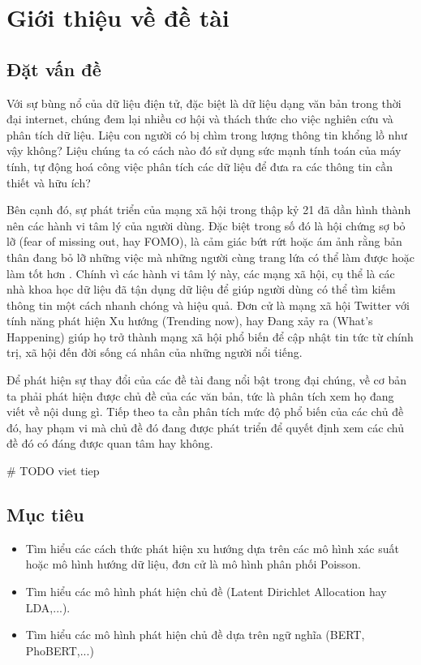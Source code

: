 \section{Giới thiệu về đề tài}
\label{sec:introduction}

\subsection{Đặt vấn đề}
Với sự bùng nổ của dữ liệu điện tử, đặc biệt là dữ liệu dạng văn bản trong thời
đại internet, chúng đem lại nhiều cơ hội và thách thức cho việc nghiên cứu và
phân tích dữ liệu. Liệu con người có bị chìm trong lượng thông tin khổng lồ như
vậy không? Liệu chúng ta có cách nào đó sử dụng sức mạnh tính toán của máy
tính, tự động hoá công việc phân tích các dữ liệu để đưa ra các thông tin cần
thiết và hữu ích?

Bên cạnh đó, sự phát triển của mạng xã hội trong thập kỷ 21 đã dần hình thành
nên các hành vi tâm lý của người dùng. Đặc biệt trong số đó là hội chứng sợ bỏ
lỡ (fear of missing out, hay FOMO), là cảm giác bứt rứt hoặc ám ảnh rằng bản
thân đang bỏ lỡ những việc mà những người cùng trang lứa có thể làm được hoặc
làm tốt hơn \cite{jwtintelligence_fear_2015}. Chính vì các hành vi tâm lý này,
các mạng xã hội, cụ thể là các nhà khoa học dữ liệu đã tận dụng dữ liệu để giúp
người dùng có thể tìm kiếm thông tin một cách nhanh chóng và hiệu quả. Đơn cử
là mạng xã hội Twitter với tính năng phát hiện Xu hướng (Trending now), hay
Đang xảy ra (What's Happening) giúp họ trở thành mạng xã hội phổ biến để cập
nhật tin tức từ chính trị, xã hội đến đời sống cá nhân của những người nổi
tiếng.

Để phát hiện sự thay đổi của các đề tài đang nổi bật trong đại chúng, về cơ bản
ta phải phát hiện được chủ đề của các văn bản, tức là phân tích xem họ đang
viết về nội dung gì.  Tiếp theo ta cần phân tích mức độ phổ biến của các chủ đề
đó, hay phạm vi mà chủ đề đó đang được phát triển để quyết định xem các chủ đề
đó có đáng được quan tâm hay không.

\# TODO viet tiep

\subsection{Mục tiêu}
\begin{itemize}
	\item Tìm hiểu các cách thức phát hiện xu hướng dựa trên các mô hình xác
		suất hoặc mô hình hướng dữ liệu, đơn cử là mô hình phân phối Poisson.

	\item Tìm hiểu các mô hình phát hiện chủ đề (Latent Dirichlet Allocation
		hay LDA,...).

	\item Tìm hiểu các mô hình phát hiện chủ đề dựa trên ngữ nghĩa (BERT,
		PhoBERT,...)
\end{itemize}


